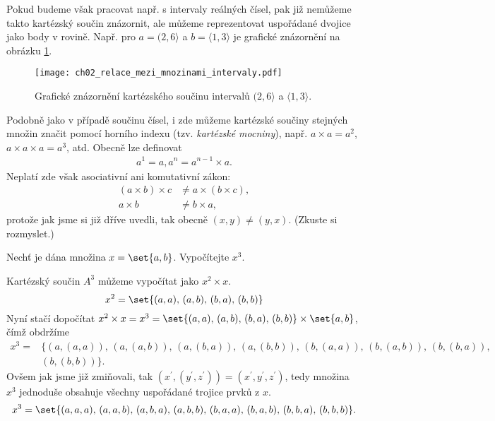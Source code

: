 Pokud budeme však pracovat např. s intervaly reálných čísel, pak již nemůžeme takto kartézský součin znázornit, ale můžeme reprezentovat uspořádané dvojice jako body v rovině. Např. pro $a=(2, 6\rangle$ a $b=\langle 1,3 \rangle$ je grafické znázornění na obrázku \ref{fig:kartezsky_soucin_intervaly}.
\begin{figure}[h]
    \centering
    \texttt{[image: ch02\_relace\_mezi\_mnozinami\_intervaly.pdf]}
    \caption{Grafické znázornění kartézského součinu intervalů $(2, 6\rangle$ a $\langle 1,3 \rangle$.}
    \label{fig:kartezsky_soucin_intervaly}
\end{figure}
Podobně jako v případě součinu čísel, i zde můžeme kartézské součiny stejných množin značit pomocí horního indexu (tzv. \emph{kartézské mocniny}), např. $a\times a=a^2$, $a\times a\times a=a^3$, atd. Obecně lze definovat
\begin{align*}
    a^1=a,
    a^n=a^{n-1}\times a.
\end{align*}
Neplatí zde však asociativní ani komutativní zákon:
\begin{align*}
    (a\times b)\times c&\neq a\times (b\times c),\\
    a\times b&\neq b\times a,
\end{align*}
protože jak jsme si již dříve uvedli, tak obecně $(x,y)\neq (y,x)$. (Zkuste si rozmyslet.)
\begin{example}
    Nechť je dána množina $x=\set{a,b}$. Vypočítejte $x^3$.
\end{example}
\begin{solution}
    Kartézský součin $A^3$ můžeme vypočítat jako $x^2\times x$.
    \begin{equation*}
        x^2=\set{(a,a),\,(a,b),\,(b,a),\,(b,b)}
    \end{equation*}
    Nyní stačí dopočítat $x^2\times x=x^3=\set{(a,a),\,(a,b),\,(b,a),\,(b,b)}\times\set{a,b}$, čímž obdržíme
    \begin{align*}
        x^3=&\{(a,(a,a)),\,(a,(a,b)),\,(a,(b,a)),\,(a,(b,b)),\,(b,(a,a)),\,(b,(a,b)),\,(b,(b,a)),\\
        &(b,(b,b))\}.
    \end{align*}
    Ovšem jak jsme již zmiňovali, tak $(x^\prime,(y^\prime,z^\prime))=(x^\prime,y^\prime,z^\prime)$, tedy množina $x^3$ jednoduše obsahuje všechny uspořádané trojice prvků z $x$.
    \begin{equation*}
        x^3=\set{(a,a,a),\,(a,a,b),\,(a,b,a),\,(a,b,b),\,(b,a,a),\,(b,a,b),\,(b,b,a),\,(b,b,b)}.
    \end{equation*}
\end{solution}


